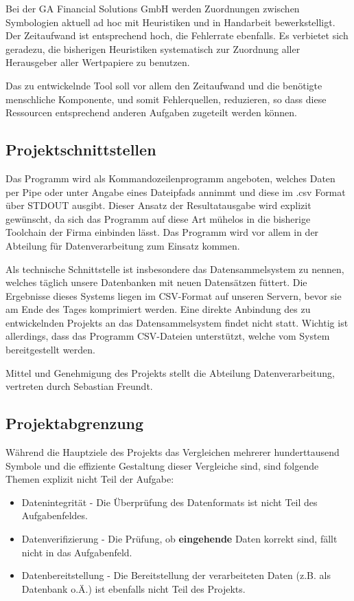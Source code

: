 Bei der GA Financial Solutions GmbH werden Zuordnungen zwischen Symbologien
aktuell ad hoc mit Heuristiken und in Handarbeit bewerkstelligt.  Der
Zeitaufwand ist entsprechend hoch, die Fehlerrate ebenfalls.  Es
verbietet sich geradezu, die bisherigen Heuristiken systematisch zur
Zuordnung aller Herausgeber aller Wertpapiere zu benutzen.\par

Das zu entwickelnde Tool soll vor allem den Zeitaufwand und die benötigte
menschliche Komponente, und somit Fehlerquellen, reduzieren, so dass diese Ressourcen entsprechend
anderen Aufgaben zugeteilt werden können.\par

\subsection{Projektschnittstellen}
Das Programm wird als Kommandozeilenprogramm angeboten, welches
Daten per Pipe oder unter Angabe eines Dateipfads annimmt und diese im .csv 
Format über STDOUT ausgibt. Dieser Ansatz der Resultatausgabe wird explizit gewünscht, 
da sich das Programm auf diese Art mühelos in die bisherige Toolchain der Firma einbinden lässt.
Das Programm wird vor allem in der Abteilung für Datenverarbeitung zum Einsatz kommen.\par

Als technische Schnittstelle ist insbesondere das Datensammelsystem zu nennen,
welches täglich unsere Datenbanken mit neuen Datensätzen füttert. Die Ergebnisse
dieses Systems liegen im CSV-Format auf unseren Servern, bevor sie am Ende des
Tages komprimiert werden. Eine direkte Anbindung des zu entwickelnden Projekts an das Datensammelsystem findet nicht statt. Wichtig ist allerdings, dass das Programm CSV-Dateien unterstützt, welche vom System bereitgestellt werden.\par

Mittel und Genehmigung des Projekts stellt die Abteilung Datenverarbeitung,
vertreten durch Sebastian Freundt.\par

\subsection{Projektabgrenzung}
Während die Hauptziele des Projekts das Vergleichen mehrerer hunderttausend Symbole und die effiziente Gestaltung dieser Vergleiche sind, sind folgende Themen explizit nicht Teil der Aufgabe:

\begin{itemize}
    \item Datenintegrität - Die Überprüfung des Datenformats ist nicht Teil des Aufgabenfeldes.
    \item Datenverifizierung - Die Prüfung, ob \textbf{eingehende} Daten korrekt sind, fällt nicht in das Aufgabenfeld.
    \item Datenbereitstellung - Die Bereitstellung der verarbeiteten Daten (z.B. als Datenbank o.Ä.) ist ebenfalls nicht Teil des Projekts.
\end{itemize}
\clearpage

